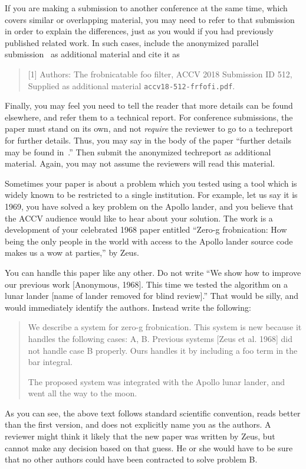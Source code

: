 \documentclass[runningheads]{llncs}
\begin{document}
If you are making a submission to another conference at the same time,
which covers similar or overlapping material, you may need to refer to that
submission in order to explain the differences, just as you would if you
had previously published related work.  In such cases, include the
anonymized parallel submission~\cite{Authors18} as additional material and
cite it as
\begin{quote}
[1]  Authors: The frobnicatable foo filter, ACCV 2018 Submission ID 512,
Supplied as additional material {\tt accv18-512-frfofi.pdf}.
\end{quote}

Finally, you may feel you need to tell the reader that more details can be found elsewhere, and refer them to a technical report.  For conference submissions, the paper must stand on its own, and not {\em require} the reviewer to go to a techreport for further details.  Thus, you may say in the body of the paper ``further details may be found in~\cite{Authors18b}.''  Then submit the anonymized techreport as additional material. Again, you may not assume the reviewers will read this material.

Sometimes your paper is about a problem which you tested using a tool which
is widely known to be restricted to a single institution.  For example,
let us say it is 1969, you have solved a key problem on the Apollo lander,
and you believe that the ACCV audience would like to hear about your
solution.  The work is a development of your celebrated 1968 paper entitled
``Zero-g frobnication: How being the only people in the world with access to
the Apollo lander source code makes us a wow at parties,'' by Zeus.

You can handle this paper like any other.  Do not write ``We show how to
improve our previous work [Anonymous, 1968].  This time we tested the
algorithm on a lunar lander [name of lander removed for blind review].''
That would be silly, and would immediately identify the authors. Instead
write the following:
%
\begin{quotation}
\noindent
   We describe a system for zero-g frobnication.  This
   system is new because it handles the following cases:
   A, B.  Previous systems [Zeus et al. 1968] did not
   handle case B properly.  Ours handles it by including
   a foo term in the bar integral.

   The proposed system was integrated with the Apollo
   lunar lander, and went all the way to the moon.  
\end{quotation}
%
As you can see, the above text follows standard scientific convention,
reads better than the first version, and does not explicitly name you as
the authors.  A reviewer might think it likely that the new paper was
written by Zeus, but cannot make any decision based on that guess.
He or she would have to be sure that no other authors could have been
contracted to solve problem B. \\
\end{document}
